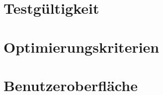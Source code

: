\newpage
\section{Testgültigkeit}
\paragraph{}

\newpage
\section{Optimierungskriterien}
\paragraph{}

\newpage
\section{Benutzeroberfläche}
\paragraph{}


